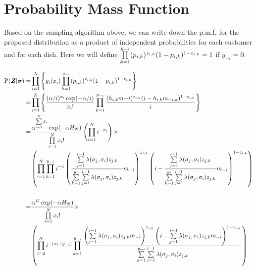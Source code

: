 

\section{Probability Mass Function}
Based on the sampling algorithm above, we can write down the p.m.f. for the
proposed distribution as a product of independent probabilities for 
each customer and for each dish. Here we will define 
$\prod\limits_{k=1}^{y_{-i}} (p_{i,k})^{z_{i,k}}(1-p_{i,k})^{1-z_{i,k}}=1$ if $y_{-i}=0$.

\begin{align*}
  \text{P}(\bm Z|\bm\sigma)
  =&\prod\limits_{i=1}^{N} \left\{g_i(x_i) \prod\limits_{k=1}^{y_{-i}} 
    (p_{i,k})^{z_{i,k}}(1-p_{i,k})^{1-z_{i,k}}\right\}\\
  =&\prod\limits_{i=1}^{N} \left\{ \displaystyle\frac{(\alpha/i)^{x_i}\exp(-\alpha/i)}{x_i!} 
    \prod\limits_{k=1}^{y_{-i}} 
    \displaystyle\frac{(h_{i,k}m{-i})^{z_{i,k}}(i-h_{i,k}m_{-i,k})^{1-z_{i,k}}}{i} 
    \right\} \\
  =&\displaystyle\frac{\alpha^{\sum\limits_{i=1}^{N}x_i} \exp(-\alpha H_N)} {\prod\limits_{i=1}^{N}x_i!} 
    \left( \prod\limits_{i=1}^{N}i^{-x_i} \right) \times
    \\
    &\left( \prod\limits_{i=1}^{N}\prod\limits_{k=1}^{y_{-i}} i^{-1}
    \displaystyle\left(\displaystyle\frac{\sum\limits_{j=1}^{i-1}\lambda(\sigma_j,\sigma_i)z_{j,k}} {\sum\limits_{k=1}^{y_i}\sum\limits_{j=1}^{i-1}\lambda(\sigma_j,\sigma_i)z_{j,k}} m_{-i}\right)^{z_{i,k}}
       \left(i-\displaystyle\frac{\sum\limits_{j=1}^{i-1}\lambda(\sigma_j,\sigma_i)z_{j,k}} {\sum\limits_{k=1}^{y_i}\sum\limits_{j=1}^{i-1}\lambda(\sigma_j,\sigma_i)z_{j,k}} m_{-i}\right)^{1-z_{i,k}} \right)\\
   &\\
  =&\displaystyle\frac{\alpha^K \exp(-\alpha H_N)} {\prod\limits_{i=1}^{N}x_i!} \times
    \\
    &\left( \prod\limits_{i=2}^{N} i^{-(x_i+y_{-i})}\prod\limits_{k=1}^{y_{-i}} 
    \displaystyle\frac{
    \left(\sum\limits_{j=1}^{i-1}\lambda(\sigma_j,\sigma_i)z_{j,k}m_{-i}\right)^{z_{i,k}}
    \left(i-\sum\limits_{j=1}^{i-1}
    \lambda(\sigma_j,\sigma_i)z_{j,k}m_{-i}\right)^{1-z_{i,k}}
    }
    {\sum\limits_{k=1}^{y_{-i}}\sum\limits_{j=1}^{i-1}\lambda(\sigma_j,\sigma_i)z_{j,k}}\right)
\end{align*}

